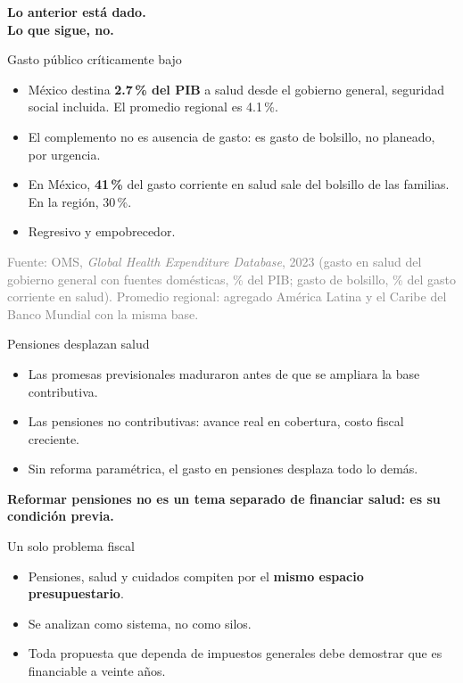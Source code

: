 \documentclass[aspectratio=169,11pt]{beamer}
\newcommand{\clave}[1]{\textcolor{acento}{\textbf{#1}}}
\newcommand{\destacar}[1]{\vspace{0.6em}\begin{center}\textbf{#1}\end{center}}
\newcommand{\pie}[1]{\vfill{\scriptsize\textcolor{gray}{#1}}}
\newcommand{\frase}[1]{\begin{center}\Large\textbf{#1}\end{center}}
\begin{document}

\begin{frame}[plain]
  \vfill
  \frase{Lo anterior está dado.\\[0.4em] Lo que sigue, no.}
  \vfill
\end{frame}

\begin{frame}{Gasto público críticamente bajo}
  \begin{itemize}
    \item México destina \clave{2.7\,\% del PIB} a salud desde el gobierno general, seguridad social incluida. El promedio regional es 4.1\,\%.
    \item El complemento no es ausencia de gasto: es gasto de bolsillo, no planeado, por urgencia.
    \item En México, \clave{41\,\%} del gasto corriente en salud sale del bolsillo de las familias. En la región, 30\,\%.
    \item Regresivo y empobrecedor.
  \end{itemize}
  \pie{Fuente: OMS, \emph{Global Health Expenditure Database}, 2023 (gasto en salud del gobierno general con fuentes domésticas, \% del PIB; gasto de bolsillo, \% del gasto corriente en salud). Promedio regional: agregado América Latina y el Caribe del Banco Mundial con la misma base.}
\end{frame}

\begin{frame}{Pensiones desplazan salud}
  \begin{itemize}
    \item Las promesas previsionales maduraron antes de que se ampliara la base contributiva.
    \item Las pensiones no contributivas: avance real en cobertura, costo fiscal creciente.
    \item Sin reforma paramétrica, el gasto en pensiones desplaza todo lo demás.
  \end{itemize}
  \destacar{Reformar pensiones no es un tema separado de financiar salud: es su condición previa.}
\end{frame}

\begin{frame}{Un solo problema fiscal}
  \begin{itemize}
    \item Pensiones, salud y cuidados compiten por el \clave{mismo espacio presupuestario}.
    \item Se analizan como sistema, no como silos.
    \item Toda propuesta que dependa de impuestos generales debe demostrar que es financiable a veinte años.
  \end{itemize}
\end{frame}
\end{document}
